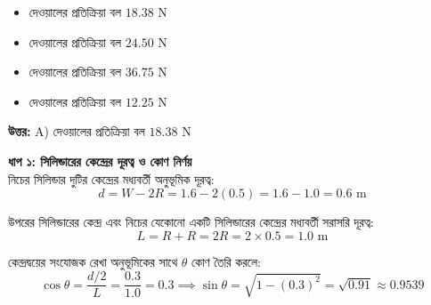 \documentclass[12pt, a4paper]{article}
\begin{document}
{{\begin{center}
\end{center}
\vspace{1em}

\begin{itemize}[label={}, leftmargin=1cm, itemsep=0.5em]
    \item[\textbf{A)}] দেওয়ালের প্রতিক্রিয়া বল $18.38\text{ N}$
    \item[\textbf{B)}] দেওয়ালের প্রতিক্রিয়া বল $24.50\text{ N}$
    \item[\textbf{C)}] দেওয়ালের প্রতিক্রিয়া বল $36.75\text{ N}$
    \item[\textbf{D)}] দেওয়ালের প্রতিক্রিয়া বল $12.25\text{ N}$
\end{itemize}

\vspace{0.5em}
\begin{tcolorbox}[answerbox]
    \textbf{\color{success} উত্তর:} A) দেওয়ালের প্রতিক্রিয়া বল $18.38\text{ N}$
\end{tcolorbox}
\vspace{1em}

\begin{tcolorbox}[solutionbox={সমাধান (Solution)}]
    \noindent
    \textbf{ধাপ ১: সিলিন্ডারের কেন্দ্রের দূরত্ব ও কোণ নির্ণয়} \\
    নিচের সিলিন্ডার দুটির কেন্দ্রের মধ্যবর্তী অনুভূমিক দূরত্ব:
    \[ d = W - 2R = 1.6 - 2(0.5) = 1.6 - 1.0 = 0.6\text{ m} \]
    
    উপরের সিলিন্ডারের কেন্দ্র এবং নিচের যেকোনো একটি সিলিন্ডারের কেন্দ্রের মধ্যবর্তী সরাসরি দূরত্ব:
    \[ L = R + R = 2R = 2 \times 0.5 = 1.0\text{ m} \]
    
    কেন্দ্রদ্বয়ের সংযোজক রেখা অনুভূমিকের সাথে $\theta$ কোণ তৈরি করলে:
    \[ \cos\theta = \frac{d/2}{L} = \frac{0.3}{1.0} = 0.3 \implies \sin\theta = \sqrt{1 - (0.3)^2} = \sqrt{0.91} \approx 0.9539 \]
    

\end{tcolorbox}}}
\end{document}
